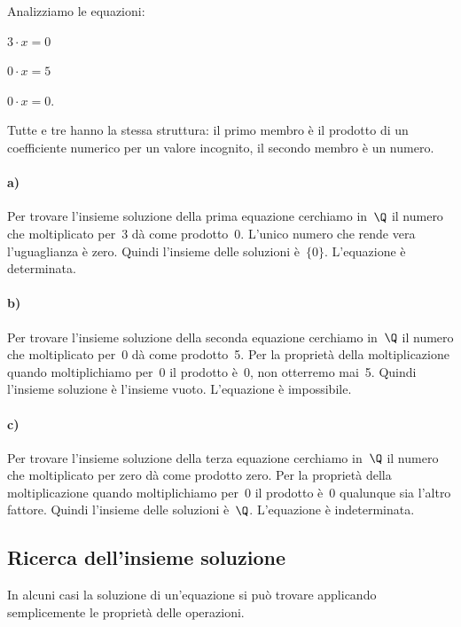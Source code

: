  \begin{esempio}
 Analizziamo le equazioni:
\begin{multicols}{3}
 \begin{enumeratea}
 \item \(3\cdot x=0\)
 \item \(0\cdot x=5\)
 \item \(0\cdot x=0\).
\end{enumeratea}
\end{multicols}

Tutte e tre hanno la stessa struttura: il primo membro è il prodotto
di un coefficiente numerico per un valore incognito, il secondo membro
è un numero.

\paragraph{a)} Per trovare l'insieme soluzione della prima equazione 
cerchiamo 
in~\(\Q\) il
numero che moltiplicato per~3 dà come prodotto~0. L'unico numero che rende 
vera
l'uguaglianza è zero. Quindi l'insieme delle soluzioni è~\(\{0\}\). 
L'equazione 
è
determinata.

\paragraph{b)} Per trovare l'insieme soluzione della seconda equazione 
cerchiamo 
in~\(\Q\) il
numero che moltiplicato per~0 dà come prodotto~5. Per la proprietà
della moltiplicazione quando moltiplichiamo per~0 il prodotto è~0,
non otterremo mai~5. Quindi l'insieme soluzione è
l'insieme vuoto. L'equazione è
impossibile.

\paragraph{c)} Per trovare l'insieme soluzione della terza equazione 
cerchiamo 
in~\(\Q\) il
numero che moltiplicato per zero dà come prodotto zero. Per la
proprietà della moltiplicazione quando moltiplichiamo per~0 il
prodotto è~0 qualunque sia l'altro fattore. Quindi
l'insieme delle soluzioni è~\(\Q\). L'equazione è
indeterminata.
 \end{esempio}

\subsection{Ricerca dell'insieme soluzione}
In alcuni casi la soluzione di un'equazione si può
trovare applicando semplicemente le proprietà delle operazioni.

